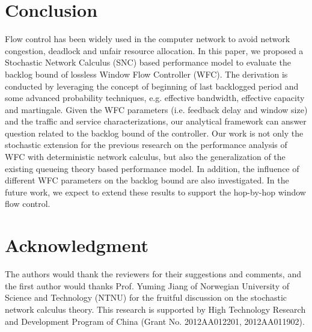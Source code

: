 \documentclass[paper]{ieice}
\begin{document}
\section{Conclusion}\label{concluson}
Flow control has been widely used in the computer network to avoid network congestion, deadlock and unfair resource allocation. In this paper, we proposed a Stochastic Network Calculus (SNC) based performance model to evaluate the backlog bound of lossless Window Flow Controller (WFC). The derivation is conducted by leveraging the concept of beginning of last backlogged period and some advanced probability techniques, e.g. effective bandwidth, effective capacity and martingale. Given the WFC parameters (i.e. feedback delay and window size) and the traffic and service characterizations, our analytical framework can answer question related to the backlog bound of the controller. Our work is not only the stochastic extension for the previous research on the performance analysis of WFC with deterministic network calculus, but also the generalization of the existing queueing theory based performance model. In addition, the influence of different WFC parameters on the backlog bound are also investigated. In the future work, we expect to extend these results to support the hop-by-hop window flow control.

\section*{Acknowledgment}
The authors would thank the reviewers for their suggestions and comments, and the first author would thanks Prof. Yuming Jiang of Norwegian University of Science and Technology (NTNU) for the fruitful discussion on the stochastic network calculus theory. This research is supported by High Technology Research and Development Program of China (Grant No. 2012AA012201, 2012AA011902).


\end{document}
